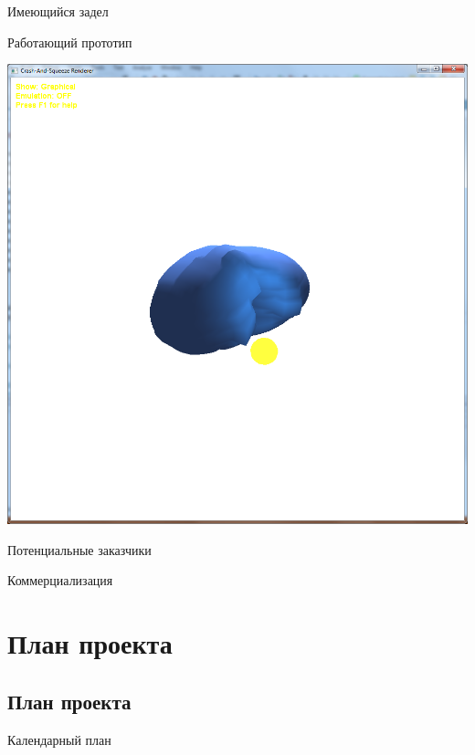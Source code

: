 \documentclass[usenames,dvipsnames,pdftex,unicode,hidelinks]{beamer}
\begin{document}
  \begin{frame}{Имеющийся задел}
    \begin{center}
      Работающий прототип

      \includegraphics[height=0.7\textheight]{prototype}
    \end{center}
  \end{frame}

  \begin{frame}{Потенциальные заказчики}

  \end{frame}

  \begin{frame}{Коммерциализация}

  \end{frame}

  \section{План проекта}
  \subsection{План проекта}
  \begin{frame}{Календарный план}

  \end{frame}
\end{document}
